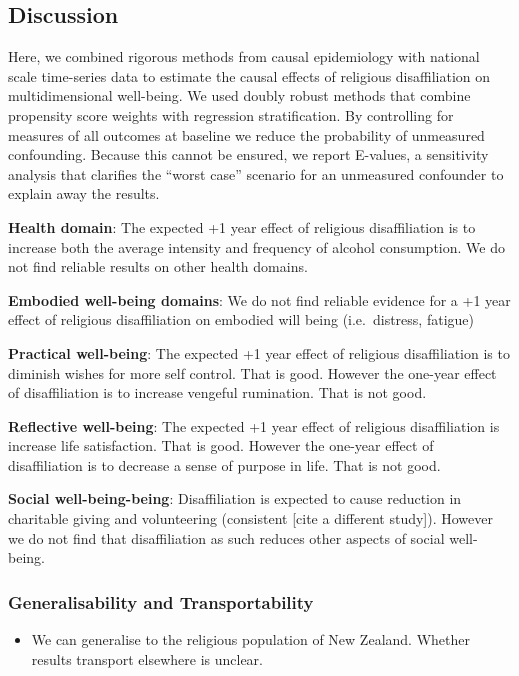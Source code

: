 \documentclass[
  letterpaper,
  DIV=11,
  numbers=noendperiod]{scrartcl}
\providecommand{\tightlist}{%
  \setlength{\itemsep}{0pt}\setlength{\parskip}{0pt}}\usepackage{longtable,booktabs,array}
\begin{document}
\hypertarget{discussion}{%
\subsection{Discussion}\label{discussion}}

Here, we combined rigorous methods from causal epidemiology with
national scale time-series data to estimate the causal effects of
religious disaffiliation on multidimensional well-being. We used doubly
robust methods that combine propensity score weights with regression
stratification. By controlling for measures of all outcomes at baseline
we reduce the probability of unmeasured confounding. Because this cannot
be ensured, we report E-values, a sensitivity analysis that clarifies
the ``worst case'' scenario for an unmeasured confounder to explain away
the results.

\textbf{Health domain}: The expected +1 year effect of religious
disaffiliation is to increase both the average intensity and frequency
of alcohol consumption. We do not find reliable results on other health
domains.

\textbf{Embodied well-being domains}: We do not find reliable evidence
for a +1 year effect of religious disaffiliation on embodied will being
(i.e.~distress, fatigue)

\textbf{Practical well-being}: The expected +1 year effect of religious
disaffiliation is to diminish wishes for more self control. That is
good. However the one-year effect of disaffiliation is to increase
vengeful rumination. That is not good.

\textbf{Reflective well-being}: The expected +1 year effect of religious
disaffiliation is increase life satisfaction. That is good. However the
one-year effect of disaffiliation is to decrease a sense of purpose in
life. That is not good.

\textbf{Social well-being-being}: Disaffiliation is expected to cause
reduction in charitable giving and volunteering (consistent {[}cite a
different study{]}). However we do not find that disaffiliation as such
reduces other aspects of social well-being.

\hypertarget{generalisability-and-transportability}{%
\subsubsection{Generalisability and
Transportability}\label{generalisability-and-transportability}}

\begin{itemize}
\tightlist
\item
  We can generalise to the religious population of New Zealand. Whether
  results transport elsewhere is unclear.
\end{itemize}
\end{document}
